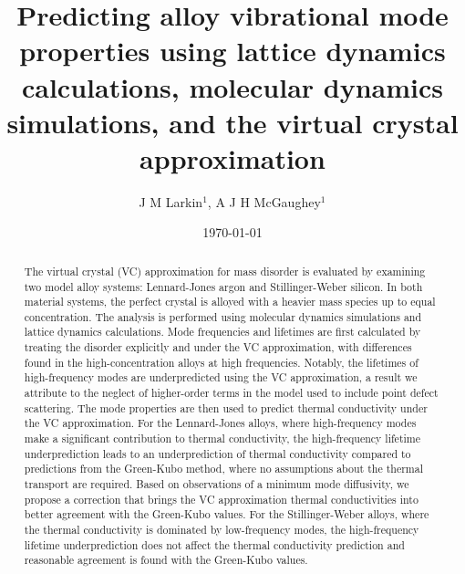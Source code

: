 \documentclass[aps,prb,onecolumn,preprint,footinbib,superscriptaddress,amsmath,amssymb,floatfix]{revtex4}
\begin{document}

\title{Predicting alloy vibrational mode properties using lattice
dynamics calculations, molecular dynamics simulations, and the virtual
crystal approximation}
\author{J M Larkin$^1$, A J H McGaughey$^1$ }
\address{$^1$ Department of Mechanical Engineering\\Carnegie Mellon University\\Pittsburgh, PA 15213}

\date{\today}


\begin{abstract}
The virtual crystal (VC) approximation for mass disorder is evaluated by
examining two model alloy systems: Lennard-Jones argon and Stillinger-Weber
silicon. 
In both material systems, the perfect crystal is alloyed with a heavier mass
species up to equal concentration.
The analysis is performed using molecular dynamics simulations and lattice
dynamics calculations.
Mode frequencies and lifetimes are first calculated by treating the disorder
explicitly and under the VC approximation, with differences found in the
high-concentration alloys at high frequencies. 
Notably, the lifetimes of high-frequency modes are underpredicted using the
VC approximation, a result we attribute to the neglect of higher-order terms 
in the model used to include point defect scattering.
The mode properties are then used to predict thermal conductivity under the
VC approximation.
For the Lennard-Jones alloys, where high-frequency modes make a significant
contribution to thermal conductivity, the high-frequency lifetime
underprediction leads to an underprediction of thermal conductivity compared
to predictions from the Green-Kubo method, where no assumptions about the
thermal transport are required.
Based on observations of a minimum mode diffusivity, we propose a correction
that brings the VC approximation thermal conductivities into better 
agreement with the Green-Kubo values. 
For the Stillinger-Weber alloys, where the thermal conductivity is dominated
by low-frequency modes, the high-frequency lifetime underprediction does not
affect the thermal conductivity prediction and reasonable agreement is found
with the Green-Kubo values. 
\end{abstract}
\end{document}
